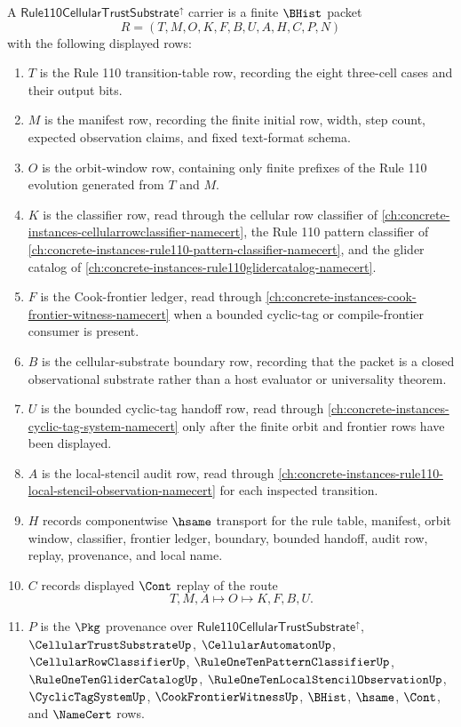 \begin{definition}
\label{def:rule110-cellular-trust-substrate-carrier}
A $\mathsf{Rule110CellularTrustSubstrate}^{\uparrow}$ carrier is a finite $\BHist$ packet
$$
R=(T,M,O,K,F,B,U,A,H,C,P,N)
$$
with the following displayed rows:
\begin{enumerate}
\item $T$ is the Rule 110 transition-table row, recording the eight three-cell cases and their output bits.
\item $M$ is the manifest row, recording the finite initial row, width, step count, expected observation claims, and fixed text-format schema.
\item $O$ is the orbit-window row, containing only finite prefixes of the Rule 110 evolution generated from $T$ and $M$.
\item $K$ is the classifier row, read through the cellular row classifier of \autoref{ch:concrete-instances-cellularrowclassifier-namecert}, the Rule 110 pattern classifier of \autoref{ch:concrete-instances-rule110-pattern-classifier-namecert}, and the glider catalog of \autoref{ch:concrete-instances-rule110glidercatalog-namecert}.
\item $F$ is the Cook-frontier ledger, read through \autoref{ch:concrete-instances-cook-frontier-witness-namecert} when a bounded cyclic-tag or compile-frontier consumer is present.
\item $B$ is the cellular-substrate boundary row, recording that the packet is a closed observational substrate rather than a host evaluator or universality theorem.
\item $U$ is the bounded cyclic-tag handoff row, read through \autoref{ch:concrete-instances-cyclic-tag-system-namecert} only after the finite orbit and frontier rows have been displayed.
\item $A$ is the local-stencil audit row, read through \autoref{ch:concrete-instances-rule110-local-stencil-observation-namecert} for each inspected transition.
\item $H$ records componentwise $\hsame$ transport for the rule table, manifest, orbit window, classifier, frontier ledger, boundary, bounded handoff, audit row, replay, provenance, and local name.
\item $C$ records displayed $\Cont$ replay of the route
$$
T,M,A \longmapsto O \longmapsto K,F,B,U .
$$
\item $P$ is the $\Pkg$ provenance over $\mathsf{Rule110CellularTrustSubstrate}^{\uparrow}$, $\CellularTrustSubstrateUp$, $\CellularAutomatonUp$, $\CellularRowClassifierUp$, $\RuleOneTenPatternClassifierUp$, $\RuleOneTenGliderCatalogUp$, $\RuleOneTenLocalStencilObservationUp$, $\CyclicTagSystemUp$, $\CookFrontierWitnessUp$, $\BHist$, $\hsame$, $\Cont$, and $\NameCert$ rows.

\end{enumerate}
\end{definition}
